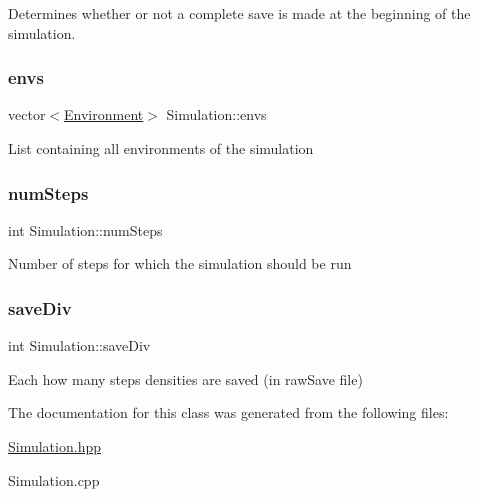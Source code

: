 Determines whether or not a complete save is made at the beginning of the simulation. \hypertarget{classSimulation_a29309017ca18043de245ef843b56c533}{}\label{classSimulation_a29309017ca18043de245ef843b56c533} 
\subsubsection{\texorpdfstring{envs}{envs}}
{\footnotesize\ttfamily vector$<$\hyperlink{classEnvironment}{Environment}$>$ Simulation\+::envs\hspace{0.3cm}{\ttfamily [protected]}}

List containing all environments of the simulation \hypertarget{classSimulation_a999ce13c1a3d4dca2bf92e346d8b709f}{}\label{classSimulation_a999ce13c1a3d4dca2bf92e346d8b709f} 
\subsubsection{\texorpdfstring{num\+Steps}{numSteps}}
{\footnotesize\ttfamily int Simulation\+::num\+Steps\hspace{0.3cm}{\ttfamily [protected]}}

Number of steps for which the simulation should be run \hypertarget{classSimulation_ae8f095e92da49a648954416b351e27c8}{}\label{classSimulation_ae8f095e92da49a648954416b351e27c8} 
\subsubsection{\texorpdfstring{save\+Div}{saveDiv}}
{\footnotesize\ttfamily int Simulation\+::save\+Div\hspace{0.3cm}{\ttfamily [protected]}}

Each how many steps densities are saved (in raw\+Save file) 

The documentation for this class was generated from the following files\+:\begin{DoxyCompactItemize}
\item 
\hyperlink{Simulation_8hpp}{Simulation.\+hpp}\item 
Simulation.\+cpp\end{DoxyCompactItemize}

